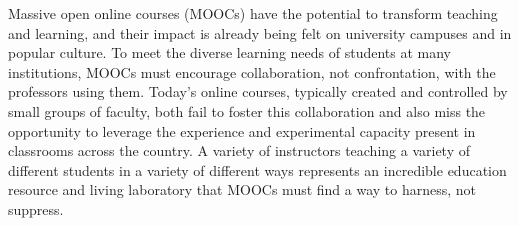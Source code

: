 Massive open online courses (MOOCs) have the potential to transform teaching
and learning, and their impact is already being felt on university campuses
and in popular culture. To meet the diverse learning needs of students at
many institutions, MOOCs must encourage collaboration, not confrontation,
with the professors using them. Today's online courses, typically created and
controlled by small groups of faculty, both fail to foster this collaboration
and also miss the opportunity to leverage the experience and experimental
capacity present in classrooms across the country. A variety of instructors
teaching a variety of different students in a variety of different ways
represents an incredible education resource and living laboratory that MOOCs
must find a way to harness, not suppress.
